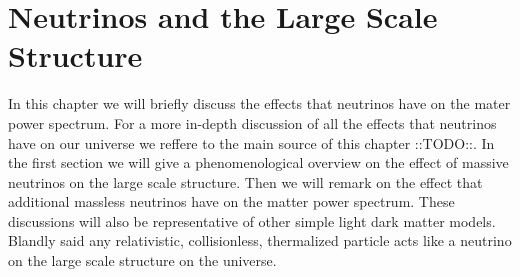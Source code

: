 \documentclass[oneside]{book}
\newcommand*{\marktodo}{{\color{mmcol} ::TODO::}\xspace}
\begin{document}
\chapter{Neutrinos and the Large Scale Structure}
In this chapter we will briefly discuss the effects that neutrinos have on the mater power spectrum. For a more in-depth discussion of all the effects that neutrinos have on our universe we reffere to the main source of this chapter \marktodo. In the first section we will give a phenomenological overview on the effect of massive neutrinos on the large scale structure. Then we will remark on the effect that additional massless neutrinos have on the matter power spectrum. These discussions will also be representative of other simple light dark matter models. Blandly said any relativistic, collisionless, thermalized particle acts like a neutrino on the large scale structure on the universe.
\end{document}

